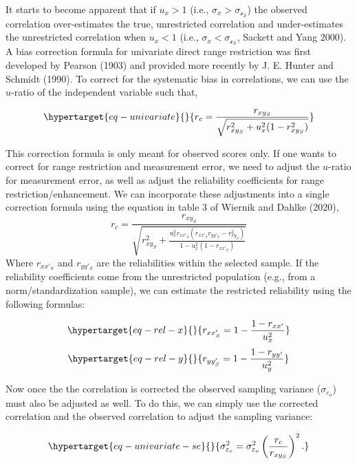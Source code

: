\documentclass[
  letterpaper,
  DIV=11,
  numbers=noendperiod]{scrreprt}
\begin{document}
It starts to become apparent that if \(u_x>1\) (i.e.,
\(\sigma_x>\sigma_\mathcal{x_S}\)) the observed correlation
over-estimates the true, unrestricted correlation and under-estimates
the unrestricted correlation when \(u_x<1\) (i.e.,
\(\sigma_x<\sigma_\mathcal{x_S}\), Sackett and Yang 2000). A bias
correction formula for univariate direct range restriction was first
developed by Pearson (1903) and provided more recently by J. E. Hunter
and Schmidt (1990). To correct for the systematic bias in correlations,
we can use the \(u\)-ratio of the independent variable such that,

\begin{equation}\protect\hypertarget{eq-univariate}{}{
r_c = \frac{r_{xy_S}}{\sqrt{r_{xy_S}^2 + u_{x}^2 (1- r_{xy_S}^2)  }}
}\label{eq-univariate}\end{equation}

This correction formula is only meant for observed scores only. If one
wants to correct for range restriction and measurement error, we need to
adjust the \(u\)-ratio for measurement error, as well as adjust the
reliability coefficients for range restriction/enhancement. We can
incorporate these adjustments into a single correction formula using the
equation in table 3 of Wiernik and Dahlke (2020), \[
r_c=\frac{r_{xy_S}}{\sqrt{r_{xy_S}^2 + \frac{u_{x}^2 r_{xx'_S}\left(r_{xx'_S}r_{yy'_S} - r_{xy_S}^2\right) }{1 - u_{x}^2 \left(1-r_{xx'_S}\right)} }}
\] Where \(r_{xx'_S}\) and \(r_{yy'_S}\) are the reliabilities within
the selected sample. If the reliability coefficients come from the
unrestricted population (e.g., from a norm/standardization sample), we
can estimate the restricted reliability using the following formulas:

\begin{equation}\protect\hypertarget{eq-rel-x}{}{
r_{xx'_S} = 1-\frac{1-r_{xx'}}{u_x^2}
}\label{eq-rel-x}\end{equation}
\begin{equation}\protect\hypertarget{eq-rel-y}{}{
r_{yy'_S} = 1-\frac{1-r_{yy'}}{u_y^2}
}\label{eq-rel-y}\end{equation}

Now once the the correlation is corrected the observed sampling variance
(\(\sigma_{\varepsilon_o}\)) must also be adjusted as well. To do this,
we can simply use the corrected correlation and the observed correlation
to adjust the sampling variance:

\begin{equation}\protect\hypertarget{eq-univariate-se}{}{
\sigma^2_{\varepsilon_c} = \sigma^2_{\varepsilon_o}\left(\frac{r_c}{r_{xy_S}}\right)^2.
}\label{eq-univariate-se}\end{equation}
\end{document}
